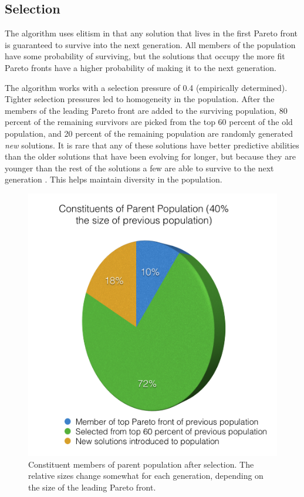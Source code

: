 \documentclass{acm_proc_article-sp}
\begin{document}
\subsection{Selection}
The algorithm uses elitism in that any solution that lives in the first Pareto front is guaranteed to survive into the next generation. All members of the population have some probability of surviving, but the solutions that occupy the more fit Pareto fronts have a higher probability of making it to the next generation.

The algorithm works with a selection pressure of 0.4 (empirically determined). Tighter selection pressures led to homogeneity in the population. After the members of the leading Pareto front are added to the surviving population, 80 percent of the remaining survivors are picked from the top 60 percent of the old population, and 20 percent of the remaining population are randomly generated {\it{new}} solutions. It is rare that any of these solutions have better predictive abilities than the older solutions that have been evolving for longer, but because they are younger than the rest of the solutions a few are able to survive to the next generation \cite{class}. This helps maintain diversity in the population.

\begin{figure}[!h]
\center
\includegraphics[scale=0.3]{Parent_Plot.png}
\caption {Constituent members of parent population after selection. The relative sizes change somewhat for each generation, depending on the size of the leading Pareto front.}
\label{fig:bullet}
\end{figure}
\end{document}

